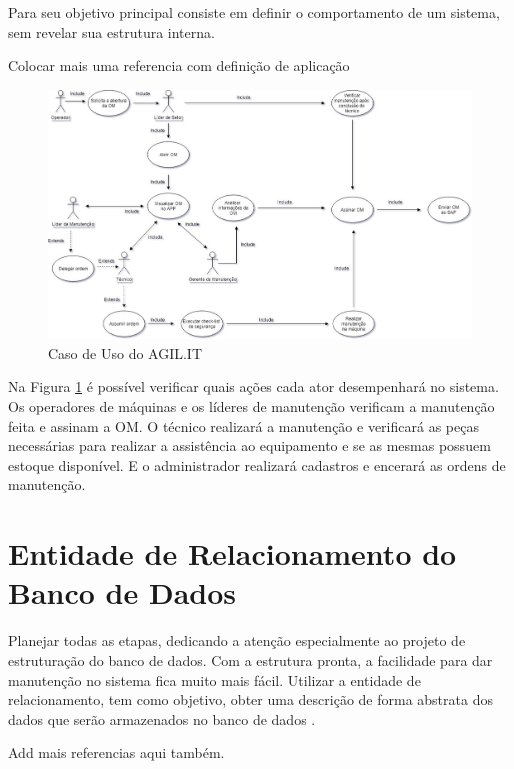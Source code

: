 {{{ Para \cite{carniello2003} seu objetivo principal consiste em definir o comportamento de um sistema, sem revelar sua estrutura interna.}

{\color{red} Colocar mais uma referencia com definição de aplicação}

\begin{figure}[htb]
	\caption{\label{caso_uso}Caso de Uso do AGIL.IT}
	\begin{center}
		\includegraphics[scale=0.50]{./Figuras/caso-uso.png}
	\end{center}
\end{figure}

Na Figura \ref{caso_uso} é possível verificar quais ações cada ator desempenhará no sistema. Os operadores de máquinas e os líderes de manutenção verificam a manutenção feita e assinam a OM. O técnico realizará a manutenção e verificará as peças necessárias para realizar a assistência ao equipamento e se as mesmas possuem estoque disponível. E o administrador realizará cadastros e encerará as ordens de manutenção.


\section{Entidade de Relacionamento do Banco de Dados}

{Planejar todas as etapas, dedicando a atenção especialmente ao projeto de estruturação do banco de dados. Com a estrutura pronta, a facilidade para dar manutenção no sistema fica muito mais fácil.
Utilizar a entidade de relacionamento, tem como objetivo, obter uma descrição de forma abstrata dos dados que serão armazenados no banco de dados \cite{2010_erbd}. }

{\color{red} Add mais referencias aqui também.}


}}
